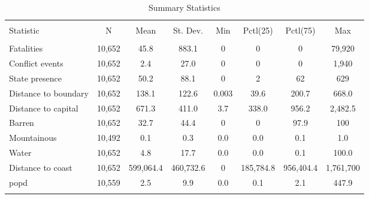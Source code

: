 
\begin{sidewaystable}[!htbp] \centering 
  \caption{Summary Statistics} 
  \label{summarystats} 
\begin{tabular}{@{\extracolsep{1pt}}lccccccc} 
\\[-1.8ex]\hline 
\hline \\[-1.8ex] 
Statistic & \multicolumn{1}{c}{N} & \multicolumn{1}{c}{Mean} & \multicolumn{1}{c}{St. Dev.} & \multicolumn{1}{c}{Min} & \multicolumn{1}{c}{Pctl(25)} & \multicolumn{1}{c}{Pctl(75)} & \multicolumn{1}{c}{Max} \\ 
\hline \\[-1.8ex] 
Fatalities & 10,652 & 45.8 & 883.1 & 0 & 0 & 0 & 79,920 \\ 
Conflict events & 10,652 & 2.4 & 27.0 & 0 & 0 & 0 & 1,940 \\ 
State presence & 10,652 & 50.2 & 88.1 & 0 & 2 & 62 & 629 \\ 
Distance to boundary & 10,652 & 138.1 & 122.6 & 0.003 & 39.6 & 200.7 & 668.0 \\ 
Distance to capital & 10,652 & 671.3 & 411.0 & 3.7 & 338.0 & 956.2 & 2,482.5 \\ 
Barren & 10,652 & 32.7 & 44.4 & 0 & 0 & 97.9 & 100 \\ 
Mountainous & 10,492 & 0.1 & 0.3 & 0.0 & 0.0 & 0.1 & 1.0 \\ 
Water & 10,652 & 4.8 & 17.7 & 0.0 & 0.0 & 0.1 & 100.0 \\ 
Distance to coast & 10,652 & 599,064.4 & 460,732.6 & 0 & 185,784.8 & 956,404.4 & 1,761,700 \\ 
popd & 10,559 & 2.5 & 9.9 & 0.0 & 0.1 & 2.1 & 447.9 \\ 
\hline \\[-1.8ex] 
\end{tabular} 
\end{sidewaystable} 
